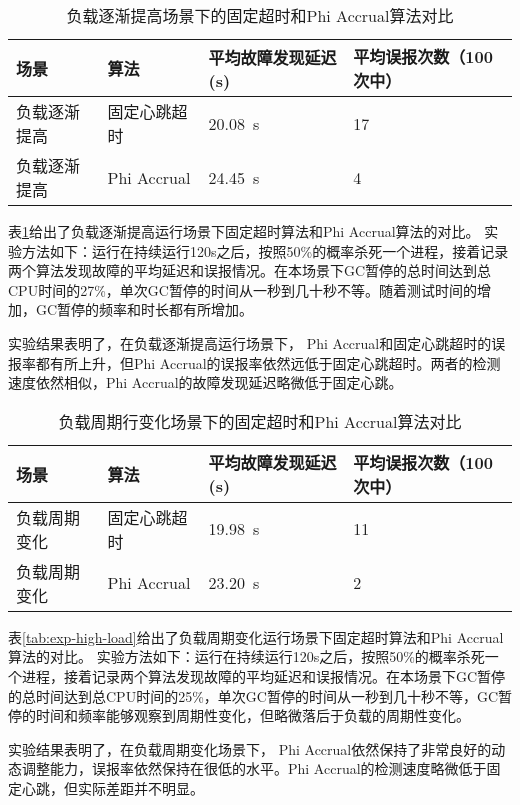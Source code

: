 \begin{table}[h!]
    \centering
    \caption{负载逐渐提高场景下的固定超时和Phi Accrual算法对比}
    \label{tab:exp-increase-load}
    \begin{tabular}{@{}llll@{}}
        \toprule
        场景 & 算法 & 平均故障发现延迟 (s) & 平均误报次数（100次中） \\
        \midrule
        负载逐渐提高 & 固定心跳超时 & \SI{20.08}{\second} & 17 \\
        负载逐渐提高 & Phi Accrual & \SI{24.45}{\second} & 4 \\
        \bottomrule
    \end{tabular}
\end{table}

表\ref{tab:exp-increase-load}给出了负载逐渐提高运行场景下固定超时算法和Phi Accrual算法的对比。
实验方法如下：运行在持续运行120s之后，按照50\%的概率杀死一个进程，接着记录两个算法发现故障的平均延迟和误报情况。在本场景下GC暂停的总时间达到总CPU时间的27\%，单次GC暂停的时间从一秒到几十秒不等。随着测试时间的增加，GC暂停的频率和时长都有所增加。

实验结果表明了，在负载逐渐提高运行场景下，
Phi Accrual和固定心跳超时的误报率都有所上升，但Phi Accrual的误报率依然远低于固定心跳超时。两者的检测速度依然相似，Phi Accrual的故障发现延迟略微低于固定心跳。


\begin{table}[h!]
    \centering
    \caption{负载周期行变化场景下的固定超时和Phi Accrual算法对比}
    \label{tab:exp-seasonal-load}
    \begin{tabular}{@{}llll@{}}
        \toprule
        场景 & 算法 & 平均故障发现延迟 (s) & 平均误报次数（100次中） \\
        \midrule
        负载周期变化 & 固定心跳超时 & \SI{19.98}{\second} & 11 \\
        负载周期变化 & Phi Accrual & \SI{23.20}{\second} & 2 \\
        \bottomrule
    \end{tabular}
\end{table}

表\ref{tab:exp-high-load}给出了负载周期变化运行场景下固定超时算法和Phi Accrual算法的对比。
实验方法如下：运行在持续运行120s之后，按照50\%的概率杀死一个进程，接着记录两个算法发现故障的平均延迟和误报情况。在本场景下GC暂停的总时间达到总CPU时间的25\%，单次GC暂停的时间从一秒到几十秒不等，GC暂停的时间和频率能够观察到周期性变化，但略微落后于负载的周期性变化。

实验结果表明了，在负载周期变化场景下，
Phi Accrual依然保持了非常良好的动态调整能力，误报率依然保持在很低的水平。Phi Accrual的检测速度略微低于固定心跳，但实际差距并不明显。

